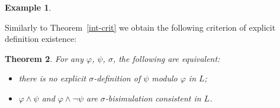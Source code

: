 \documentclass[10pt,a4paper]{amsart}
\theoremstyle{plain}
\newtheorem{thm}{Theorem}[section]
\theoremstyle{definition}
\newtheorem{exa}[thm]{Example}
\newcommand{\nz}[1]{\textcolor{blue}{\bf!}%
	\marginpar[\parbox{15mm}{\raggedleft\scriptsize\textcolor{blue}{#1}}]%
	{\parbox{15mm}{\raggedright\scriptsize\textcolor{blue}{#1}}}}
\newcommand{\QSF}{\ensuremath{\smash{\mathsf{Q^1S5}}}}
\newcommand{\QK}{\ensuremath{\smash{\mathsf{Q^1K}}}}
\newcommand{\bs}{\boldsymbol{\beta}}
\newcommand{\fform}[1]{\boldsymbol{#1}}
\newcommand{\pvar}{\fform{p}}
\newcommand{\qvar}{\fform{q}}
\newcommand{\avar}{\fform{a}}
\begin{document}
\begin{exa}
\end{exa}

Similarly to Theorem~\ref{int-crit} we obtain the following criterion of explicit definition existence:

\begin{thm}\label{p:pbdpsem}
For any $\varphi$, $\psi$, $\sigma$, the following are equivalent\textup{:}
%
\begin{itemize}
\item[--]
there is no explicit $\sigma$-definition of $\psi$ modulo $\varphi$ in $L$\textup{;}

\item[--]
$\varphi\land \psi$ and $\varphi\land\neg \psi$ are $\sigma$-bisimulation consistent in $L$. 
\end{itemize}
\end{thm}
\end{document}
